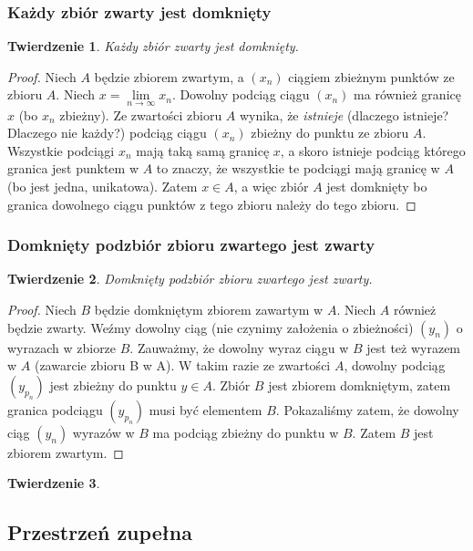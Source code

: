 \documentclass{article}
\newtheorem*{theorem}{Twierdzenie}
\begin{document}
\subsubsection{Każdy zbiór zwarty jest domknięty}
\begin{theorem}
    Każdy zbiór zwarty jest domknięty.
\end{theorem}
\begin{proof}
    Niech \(A\) będzie zbiorem zwartym, a \((x_n)\) ciągiem zbieżnym punktów ze zbioru \(A\).
    Niech \(x = \lim\limits_{n \to \infty} x_n\). Dowolny podciąg ciągu \((x_n)\) ma również granicę \(x\) (bo \(x_n\) zbieżny).
    Ze zwartości zbioru \(A\) wynika, że \emph{istnieje} (dlaczego istnieje? Dlaczego nie każdy?) podciąg ciągu \((x_n)\)
    zbieżny do punktu ze zbioru \(A\). Wszystkie podciągi \(x_n\) mają taką samą granicę \(x\), a skoro istnieje podciąg
    którego granica jest punktem w \(A\) to znaczy, że wszystkie te podciągi mają granicę w \(A\) (bo jest jedna, unikatowa).
    Zatem \(x \in A\), a więc zbiór \(A\) jest domknięty bo granica dowolnego ciągu punktów z tego zbioru należy do tego zbioru. 
\end{proof}
\subsubsection{Domknięty podzbiór zbioru zwartego jest zwarty}
\begin{theorem}
    Domknięty podzbiór zbioru zwartego jest zwarty.
\end{theorem}
\begin{proof} 
    Niech \(B\) będzie domkniętym zbiorem zawartym w \(A\). Niech \(A\) również będzie zwarty. Weźmy dowolny ciąg (nie
    czynimy założenia o zbieżności) \((y_n)\) o wyrazach w zbiorze \(B\). Zauważmy, że dowolny wyraz ciągu w 
    \(B\) jest też wyrazem w \(A\) (zawarcie zbioru B w A). W takim razie ze zwartości \(A\), dowolny podciąg \((y_{p_n})\) jest 
    zbieżny do punktu \(y \in A\). Zbiór \(B\) jest zbiorem domkniętym, zatem granica podciągu \((y_{p_n})\)
    musi być elementem \(B\). Pokazaliśmy zatem, że dowolny ciąg \((y_n)\) wyrazów w \(B\) ma podciąg zbieżny
    do punktu w \(B\). Zatem \(B\) jest zbiorem zwartym.
\end{proof}
\begin{theorem}
    
\end{theorem}

\subsection{Przestrzeń zupełna}
\end{document}
